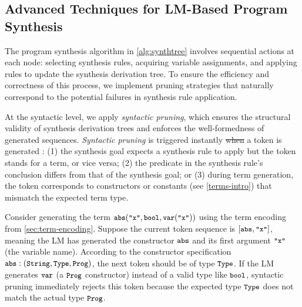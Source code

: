 \documentclass[manuscript,screen]{acmart}
\makeatletter
\newcommand{\tcode}[1]{{\small \texttt{\spaceskip=0.2em #1}}}
\providecommand{\DIFadd}[1]{{\protect\color{blue}\uwave{#1}}} %
\providecommand{\DIFdel}[1]{{\protect\color{red}\sout{#1}}} %
\providecommand{\DIFaddbegin}{} %
\providecommand{\DIFaddend}{} %
\providecommand{\DIFdelbegin}{} %
\providecommand{\DIFdelend}{} %
\providecommand{\DIFscaledelfig}{0.5}
\newlength{\DIFdelgraphicswidth} %
\newlength{\DIFdelgraphicsheight} %
\providecommand{\DIFaddincludegraphics}[2][]{{\color{blue}\fbox{\DIFOincludegraphics[#1]{#2}}}} %
\providecommand{\DIFdelincludegraphics}[2][]{%
\sbox{\DIFdelgraphicsbox}{\DIFOincludegraphics[#1]{#2}}%
\settoboxwidth{\DIFdelgraphicswidth}{\DIFdelgraphicsbox} %
\settoboxtotalheight{\DIFdelgraphicsheight}{\DIFdelgraphicsbox} %
\scalebox{\DIFscaledelfig}{%
\parbox[b]{\DIFdelgraphicswidth}{\usebox{\DIFdelgraphicsbox}\\[-\baselineskip] \rule{\DIFdelgraphicswidth}{0em}}\llap{\resizebox{\DIFdelgraphicswidth}{\DIFdelgraphicsheight}{%
\setlength{\unitlength}{\DIFdelgraphicswidth}%
\begin{picture}(1,1)%
\thicklines\linethickness{2pt} %
{\color[rgb]{1,0,0}\put(0,0){\framebox(1,1){}}}%
{\color[rgb]{1,0,0}\put(0,0){\line( 1,1){1}}}%
{\color[rgb]{1,0,0}\put(0,1){\line(1,-1){1}}}%
\end{picture}%
}\hspace*{3pt}}} %
} %
\DeclareRobustCommand{\DIFaddbegin}{\DIFOaddbegin \let\includegraphics\DIFaddincludegraphics} %
\DeclareRobustCommand{\DIFaddend}{\DIFOaddend \let\includegraphics\DIFOincludegraphics} %
\DeclareRobustCommand{\DIFdelbegin}{\DIFOdelbegin \let\includegraphics\DIFdelincludegraphics} %
\DeclareRobustCommand{\DIFdelend}{\DIFOaddend \let\includegraphics\DIFOincludegraphics} %
\let\sout@orig\sout %
\renewcommand{\sout}[1]{\ifmmode\text{\sout@orig{\ensuremath{#1}}}\else\sout@orig{#1}\fi} %
\makeatother
\begin{document}
\subsection{Advanced Techniques for LM-Based Program Synthesis}
The program synthesis algorithm in \autoref{alg:synthtree} involves sequential actions at each node: selecting synthesis rules, acquiring variable assignments, and applying rules to update the synthesis derivation tree. 
%
To ensure the efficiency and correctness of this process, we implement pruning strategies that naturally correspond to the potential failures in synthesis rule application. 

At the syntactic level, we apply \emph{syntactic pruning}, which ensures the structural validity of synthesis derivation trees and enforces the well-formedness of generated sequences.
\emph{Syntactic pruning} is triggered instantly \DIFdelbegin \DIFdel{when }\DIFdelend \DIFaddbegin \DIFadd{after }\DIFaddend a token is generated \DIFaddbegin \DIFadd{in the following cases}\DIFaddend : (1) the synthesis goal expects a synthesis rule to apply but the token stands for a term, or vice versa; (2) the predicate in the synthesis rule's conclusion differs from that of the synthesis goal; or (3) during term generation, the token corresponds to constructors or constants (see \autoref{terms-intro}) that mismatch the expected term type.
%
\begin{example}
Consider generating the term $\tcode{abs}(\tcode{"x"}, \tcode{bool}, \tcode{var}(\tcode{"x"}))$ using the term encoding from \autoref{sec:term-encoding}. Suppose the current token sequence is $[\tcode{abs}, \tcode{"x"}]$, meaning the LM has generated the constructor $\tcode{abs}$ and its first argument $\tcode{"x"}$ (the variable name). According to the constructor specification $\tcode{abs} : (\tcode{String}, \tcode{Type}, \tcode{Prog})$, the next token should be of type $\tcode{Type}$. If the LM generates $\tcode{var}$ (a $\tcode{Prog}$ constructor) instead of a valid type like $\tcode{bool}$, syntactic pruning immediately rejects this token because the expected type $\tcode{Type}$ does not match the actual type $\tcode{Prog}$.
\end{example}
\end{document}
